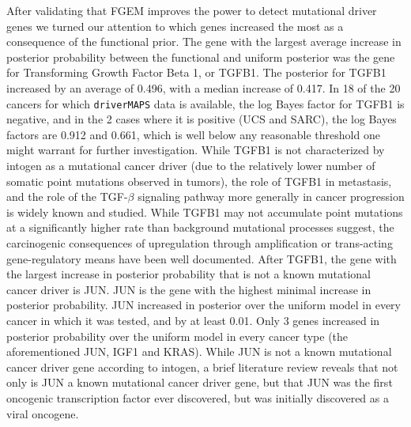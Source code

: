 After validating that FGEM improves the power to detect mutational driver genes we turned our attention to which genes increased the most as a consequence of the functional prior.  The gene with the largest average increase in posterior probability between the functional and uniform posterior  was the gene for  Transforming Growth Factor Beta 1, or TGFB1.  The posterior for TGFB1 increased by an average of 0.496, with a median increase of 0.417.  In 18 of the 20 cancers for which \texttt{driverMAPS} data is available, the log Bayes factor for TGFB1 is negative, and in the 2 cases where it is positive (UCS and SARC), the log Bayes factors are 0.912 and 0.661, which is well below any reasonable threshold one might warrant for further investigation.  While TGFB1 is not characterized by intogen as a mutational cancer driver (due to the relatively lower number of somatic point mutations observed in tumors),  the role of TGFB1 in metastasis, and the role of the TGF-$\beta$ signaling pathway more generally in cancer progression is widely known and studied\cite{TGF_Zhao_2018}.  While TGFB1 may not accumulate point mutations at a significantly higher rate than background mutational processes suggest, the carcinogenic consequences of upregulation through amplification or trans-acting gene-regulatory means have been well documented\cite{TGF_Zhao_2018}\cite{Massagu__2008}.
After TGFB1, the gene with the largest increase in posterior probability that is not a known mutational cancer driver is JUN.  JUN is the gene with the highest minimal increase in posterior probability.  JUN increased in posterior over the uniform model in every cancer in which it was tested, and by at least 0.01.  Only 3 genes increased in posterior probability over the uniform model in every cancer type (the aforementioned JUN, IGF1 and KRAS). While JUN is not a known mutational cancer driver gene according to intogen, a brief literature review reveals that not only is JUN a known mutational cancer driver gene, but that JUN was the first oncogenic transcription factor ever discovered, but was initially discovered as a viral oncogene\cite{Vogt_2002}.  

